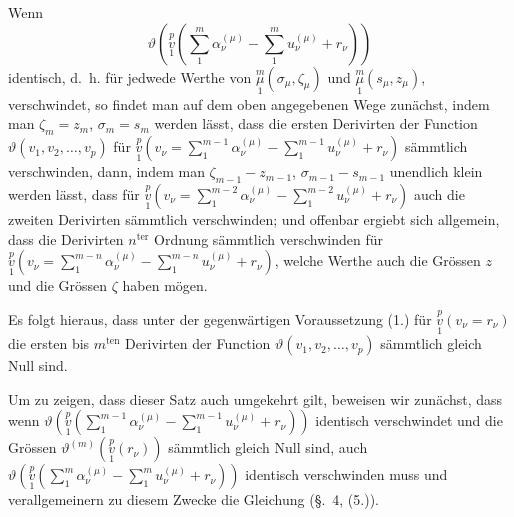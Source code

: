 \documentclass{article}
\begin{document}
Wenn
\[
\tag{(1.)}
\vartheta\left(\overset{p}{\underset{1}{v}}\left(\sum_1^m \alpha_\nu^{(\mu)} - \sum_1^m u_\nu^{(\mu)} + r_\nu\right)\right)
\]
identisch, d.~h. für jedwede Werthe von $\overset{m}{\underset{1}{\mu}}(\sigma_\mu, \zeta_\mu)$ und $\overset{m}{\underset{1}{\mu}}(s_\mu, z_\mu)$, verschwindet, so findet man auf dem oben angegebenen Wege zunächst, indem man $\zeta_m = z_m$, $\sigma_m = s_m$ werden lässt, dass die ersten Derivirten der Function $\vartheta(v_1, v_2, \dots, v_p)$ für $\overset{p}{\underset{1}{v}}\left(v_\nu = \displaystyle\sum_1^{m-1} \alpha_\nu^{(\mu)} - \displaystyle\sum_1^{m-1} u_\nu^{(\mu)} + r_\nu\right)$ sämmtlich verschwinden, dann, indem man $\zeta_{m-1} - z_{m-1}$, $\sigma_{m-1} - s_{m-1}$ unendlich klein werden lässt, dass für $\overset{p}{\underset{1}{v}}\left(v_\nu = \displaystyle\sum_1^{m-2} \alpha_\nu^{(\mu)} - \displaystyle\sum_1^{m-2} u_\nu^{(\mu)} + r_\nu\right)$ auch die zweiten Derivirten sämmtlich verschwinden; und offenbar ergiebt sich allgemein, dass die Derivirten $n^{\text{ter}}$ Ordnung sämmtlich verschwinden für $\overset{p}{\underset{1}{v}}\left(v_\nu = \displaystyle\sum_1^{m-n} \alpha_\nu^{(\mu)} - \displaystyle\sum_1^{m-n} u_\nu^{(\mu)} + r_\nu\right)$, welche Werthe auch die Grössen $z$ und die Grössen $\zeta$ haben mögen.

Es folgt hieraus, dass unter der gegenwärtigen Voraussetzung (1.) für $\overset{p}{\underset{1}{v}}(v_\nu = r_\nu)$ die ersten bis $m^{\text{ten}}$ Derivirten der Function $\vartheta(v_1, v_2, \dots, v_p)$ sämmtlich gleich Null sind.

Um zu zeigen, dass dieser Satz auch umgekehrt gilt, beweisen wir zunächst, dass wenn $\vartheta\left(\overset{p}{\underset{1}{v}}\left(\displaystyle\sum_1^{m-1} \alpha_\nu^{(\mu)} - \displaystyle\sum_1^{m-1} u_\nu^{(\mu)} + r_\nu\right)\right)$ identisch verschwindet und die Grössen $\vartheta^{(m)}\left(\overset{p}{\underset{1}{v}}(r_\nu)\right)$ sämmtlich gleich Null sind, auch $\vartheta\left(\overset{p}{\underset{1}{v}}\left(\displaystyle\sum_1^m \alpha_\nu^{(\mu)} - \displaystyle\sum_1^m u_\nu^{(\mu)} + r_\nu\right)\right)$ identisch verschwinden muss und verallgemeinern zu diesem Zwecke die Gleichung (§.~4, (5.)).
\end{document}
